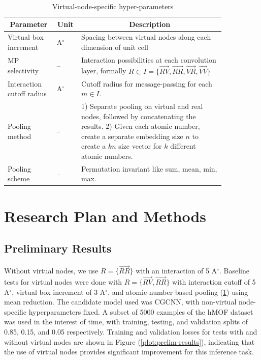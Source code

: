 \documentclass{lxaiproposal}
\begin{document}
\begin{table}[h]
        \begin{tabularx}{\linewidth}{p{0.2\linewidth} p{0.05\linewidth} p{0.6\linewidth}}
            \toprule
            \multicolumn{1}{c}{\textbf{Parameter}} & \multicolumn{1}{c}{\textbf{Unit}} & \multicolumn{1}{c}{\textbf{Description}} \\
            \midrule
            Virtual box increment & A$^\circ$ & Spacing between virtual nodes along each dimension of unit cell \\
            MP selectivity & -- & Interaction possibilities at each convolution layer, formally $R\subset I = \{\vec{RV},\vec{RR},\vec{VR},\vec{VV}\}$\\
            Interaction cutoff radius & A$^\circ$ & Cutoff radius for message-passing for each $m\in I$.\\
            Pooling method & -- &  1) Separate pooling on virtual and real nodes, followed by concatenating the results. 2) Given each atomic number, create a separate embedding size $n$ to create a $kn$ size vector for $k$ different atomic numbers.\\
            Pooling scheme & -- & Permutation invariant like sum, mean, min, max.\\
            \bottomrule
        \end{tabularx}
        \caption{Virtual-node-specific hyper-parameters}
        \label{table:vn-hparam}
\end{table}

\section*{Research Plan and Methods}

\subsection*{Preliminary Results}

Without virtual nodes, we use $R=\{\vec{RR}\}$ with an interaction of 5 A$^\circ$.
Baseline tests for virtual nodes were done with $R=\{\vec{RV},\vec{RR}\}$ with interaction cutoff of 5 A$^\circ$, virtual box increment of 3 A$^\circ$, and atomic-number based pooling (\ref{table:vn-hparam}) using mean reduction. The candidate model used was CGCNN, with non-virtual node-specific hyperparameters fixed. A subset of 5000 examples of the hMOF dataset was used in the interest of time, with training, testing, and validation splits of 0.85, 0.15, and 0.05 respectively. Training and validation losses for tests with and without virtual nodes are shown in Figure (\ref{plot:prelim-results}), indicating that the use of virtual nodes provides significant improvement for this inference task.
\end{document}
